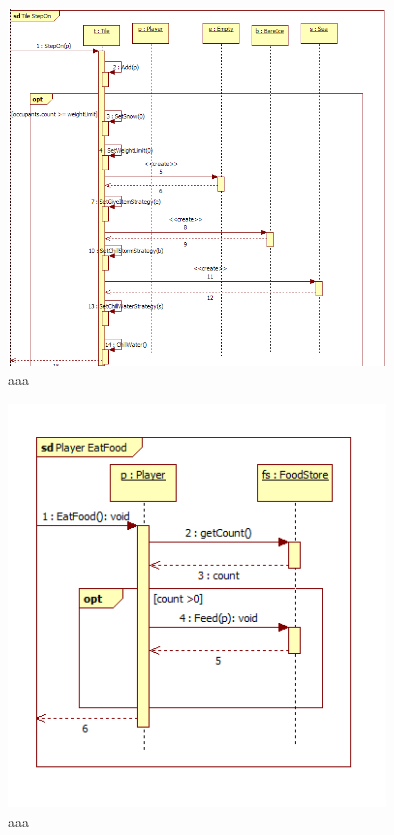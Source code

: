 \begin{figure}[H]
	\begin{center}
		\includegraphics[width=10cm]{chapters/chapter03/seqdiag/Tile_StepOn.png}
		\caption{aaa}
		\label{bbb}
	\end{center}
\end{figure}
\begin{figure}[H]
	\begin{center}
		\includegraphics[width=10cm]{chapters/chapter03/seqdiag/Player_EatFood.png}
		\caption{aaa}
		\label{bbb}
	\end{center}
\end{figure}
